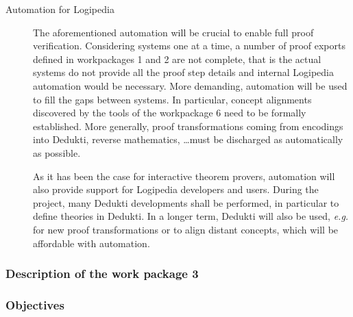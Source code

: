 \begin{description}
\item[Automation for Logipedia]

  The aforementioned automation will be crucial to enable full proof
  verification. Considering systems one at a time, a number of proof
  exports defined in workpackages 1 and 2 are not complete, that is the
  actual systems do not provide all the proof step details and internal
  Logipedia automation would be necessary. More demanding, automation
  will be used to fill the gaps between systems. In particular, concept
  alignments discovered by the tools of the workpackage 6 need to be
  formally established. More generally, proof transformations coming
  from encodings into Dedukti, reverse mathematics, \dots must be
  discharged as automatically as possible.

  As it has been the case for interactive theorem provers, automation
  will also provide support for Logipedia developers and users. During
  the project, many Dedukti developments shall be performed, in
  particular to define theories in Dedukti. In a longer term, Dedukti
  will also be used, {\em e.g.} for new proof transformations or to
  align distant concepts, which will be affordable with automation.
\end{description}


\subsubsection{Description of the work package 3}

\subsubsection*{Objectives}

